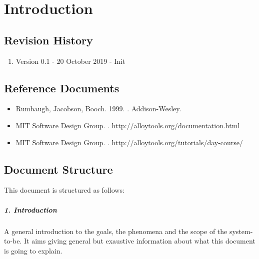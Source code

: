 \documentclass[../rasd.tex]{subfiles}
\begin{document}
\chapter{Introduction}
\thispagestyle{fancy}
		
		
		
		
	
		\section{Revision History}
		\begin{enumerate}
			\item Version 0.1 - 20 October 2019 - Init

		\end{enumerate}
		\section{Reference Documents}
		\begin{itemize}
		\item Rumbaugh, Jacobson, Booch. 1999. . Addison-Wesley.
		\item MIT Software Design Group. . http://alloytools.org/documentation.html
		\item MIT Software Design Group. . http://alloytools.org/tutorials/day-course/
		\end{itemize}
		\section{Document Structure}
		This document is structured as follows:
		\paragraph{1. Introduction}
		A general introduction to the goals, the phenomena and the scope of the system-to-be. It aims giving general but exaustive information about what this document is going to explain.
\end{document}

